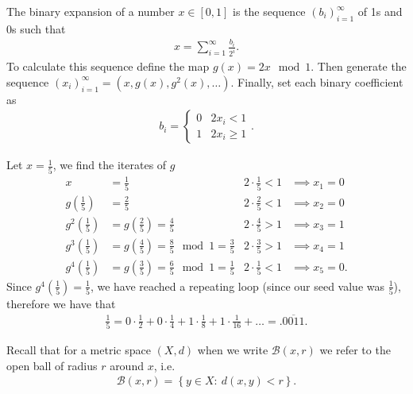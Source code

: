 \begin{definition}
	The binary expansion of a number $x\in [0,1]$ is the sequence $(b_i)_{i=1}^{\infty }$ of 1s and 0s  such that 
	\begin{align}
		x = \sum_{i=1}^{\infty } \frac{b_i}{2^i}.
	\end{align}
	To calculate this sequence define the map $g(x) = 2x \mod 1$. Then generate the sequence $(x_i)_{i=1}^{\infty }=(x, g(x), g^2(x), \ldots)$. Finally, set each binary coefficient as
	 \begin{align}
		b_i =
		\begin{cases}
			0 & 2x_i < 1 \\
			1 & 2x_i \geq 1
		\end{cases}.
	\end{align}
	
\end{definition}
\begin{ex}
	Let $x=\frac{1}{5}$, we find the iterates of $g$ 
	\begin{align}
		x &= \frac{1}{5} & 2\cdot \frac{1}{5}<1 & \implies x_1 = 0\\
		g\left(\frac{1}{5}\right) &= \frac{2}{5} & 2 \cdot \frac{2}{5}<1 &\implies x_2 = 0 \\
		g^{2}\left(\frac{1}{5}\right) &= g\left(\frac{2}{5}\right) = \frac{4}{5} & 2\cdot \frac{4}{5} > 1 &\implies x_3 = 1 \\
		g^{3}\left(\frac{1}{5}\right) &= g\left(\frac{4}{5}\right) = \frac{8}{5} \mod 1 = \frac{3}{5}& 2\cdot \frac{3}{5} > 1	  &\implies x_4 = 1 \\
		g^{4}\left(\frac{1}{5}\right) &= g\left(\frac{3}{5}\right) = \frac{6}{5} \mod 1 = \frac{1}{5}& 2\cdot \frac{1}{5} < 1	  &\implies x_5 = 0. 
	\end{align}
	Since $g^{4}\left(\frac{1}{5}\right) = \frac{1}{5}$, we have reached a repeating loop (since our seed value was $\frac{1}{5}$), therefore we have that
	\begin{align}
		\frac{1}{5} = 0\cdot \frac{1}{2} + 0\cdot \frac{1}{4} + 1\cdot \frac{1}{8} + 1\cdot \frac{1}{16} + \ldots = \bm{.} \overline{0011}. 
	\end{align}
	
\end{ex}

\begin{remark}[]
	Recall that for a metric space $(X,d)$ when we write $\mathcal{B}\left(x, r\right) $ we refer to the open ball of radius $r $ around $x $, i.e.
	\begin{align}
		\mathcal{B}\left(x,r\right) = \left\{ y\in X:\ d(x,y) < r \right\}.
	\end{align}
\end{remark}


